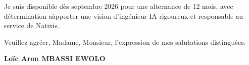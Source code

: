 \documentclass[a4paper,11pt]{article}
\begin{document}
\vspace{0.8em}
\noindent Je suis disponible d\`es septembre 2026 pour une alternance de 12 mois, avec d\'etermination a\` apporter une vision d'ing\'enieur IA rigoureux et responsable au service de Natixis.

\vspace{1.5em}
\noindent Veuillez agr\'eer, Madame, Monsieur, l'expression de mes salutations distingu\'ees.

\vspace{2em}
\noindent \textbf{Lo\"ic Aron MBASSI EWOLO}
\end{document}
